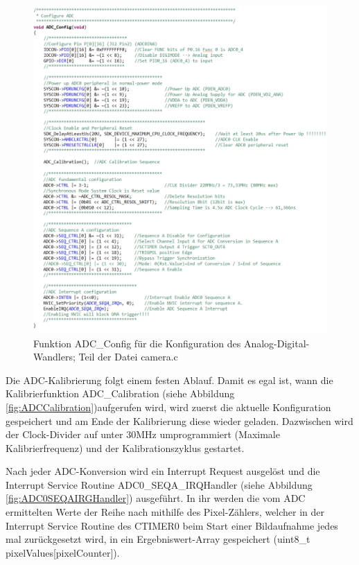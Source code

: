 \begin{figure}[H] %
\includegraphics[width=.95\textwidth]{sec7/images/code/ADCConfig} 
\centering
\captionsetup{width=.95\textwidth}
\caption[Funktion \glqq{}ADC\_Config\grqq{} aus der Datei \glqq{}camera.c\grqq{}]{Funktion \glqq{}ADC\_Config\grqq{} für die Konfiguration des Analog-Digital-Wandlers; Teil der Datei \glqq{}camera.c\grqq{}}\centering
\label{fig:ADCConfig}
\end{figure}


Die ADC-Kalibrierung folgt einem festen Ablauf. Damit es egal ist, wann die Kalibrierfunktion \glqq{}ADC\_Calibration\grqq{} (siehe Abbildung \ref{fig:ADCCalibration})aufgerufen wird, wird zuerst die aktuelle Konfiguration gespeichert und am Ende der Kalibrierung diese wieder geladen. Dazwischen wird der Clock-Divider auf unter 30MHz umprogrammiert (Maximale Kalibrierfrequenz) und der Kalibrationszyklus gestartet.\vspace{11pt}

Nach jeder ADC-Konversion wird ein Interrupt Request ausgelöst und die Interrupt Service Routine \glqq{}ADC0\_SEQA\_IRQHandler\grqq{} (siehe Abbildung \ref{fig:ADC0SEQAIRGHandler}) ausgeführt.
In ihr werden die vom ADC ermittelten Werte der Reihe nach mithilfe des Pixel-Zählers, welcher in der Interrupt Service Routine des CTIMER0 beim Start einer Bildaufnahme jedes mal zurückgesetzt wird, in ein Ergebniswert-Array gespeichert (uint8\_t pixelValues[pixelCounter]).

